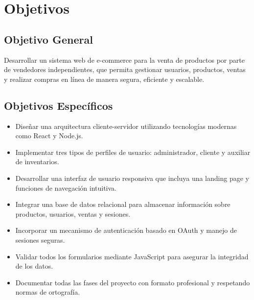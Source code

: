 \section{Objetivos}

\subsection{Objetivo General}
Desarrollar un sistema web de e-commerce para la venta de productos por parte de vendedores independientes, que permita gestionar usuarios, productos, ventas y realizar compras en línea de manera segura, eficiente y escalable.

\subsection{Objetivos Específicos}
\begin{itemize}
  \item Diseñar una arquitectura cliente-servidor utilizando tecnologías modernas como React y Node.js.
  \item Implementar tres tipos de perfiles de usuario: administrador, cliente y auxiliar de inventarios.
  \item Desarrollar una interfaz de usuario responsiva que incluya una landing page y funciones de navegación intuitiva.
  \item Integrar una base de datos relacional para almacenar información sobre productos, usuarios, ventas y sesiones.
  \item Incorporar un mecanismo de autenticación basado en OAuth y manejo de sesiones seguras.
  \item Validar todos los formularios mediante JavaScript para asegurar la integridad de los datos.
  \item Documentar todas las fases del proyecto con formato profesional y respetando normas de ortografía.
\end{itemize}
